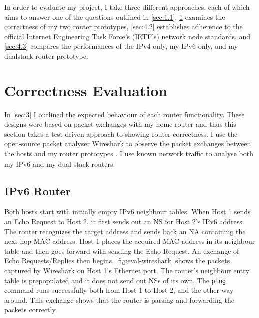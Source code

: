 




\label{sec:4}

In order to evaluate my project, I take three different approaches, each of which aims to answer one of the questions outlined in \cref{sec:1.1}. \cref{sec:4.1} examines the correctness of my two router prototypes, \cref{sec:4.2} establishes adherence to the official Internet Engineering Task Force's (IETF's) network node standards, and \cref{sec:4.3} compares the performances of the IPv4-only, my IPv6-only, and my dualstack router prototype.



\section{Correctness Evaluation}
\label{sec:4.1}

In \cref{sec:3} I outlined the expected behaviour of each router functionality. These designs were based on packet exchanges with my home router and thus this section takes a test-driven approach to showing router correctness. I use the open-source packet analyser Wireshark to observe the packet exchanges between the hosts and my router prototypes \cite{Wireshark}. I use known network traffic to analyse both my IPv6 and my dual-stack routers.



\subsection{IPv6 Router}
\label{sec:4.1.1}

Both hosts start with initially empty IPv6 neighbour tables. When Host 1 sends an Echo Request to Host 2, it first sends out an NS for Host 2's IPv6 address. The router recognizes the target address and sends back an NA containing the next-hop MAC address. Host 1 places the acquired MAC address in its neighbour table and then goes forward with sending the Echo Request. An exchange of Echo Requests/Replies then begins. \cref{fig:eval-wireshark} shows the packets captured by Wireshark on Host 1's Ethernet port. The router's neighbour entry table is prepopulated and it does not send out NSs of its own. The \texttt{ping} command runs successfully both from Host 1 to Host 2, and the other way around. This exchange shows that the router is parsing and forwarding the packets correctly.

